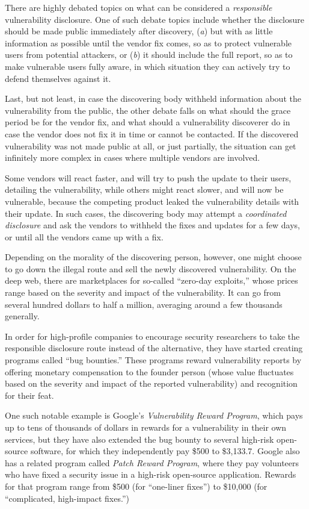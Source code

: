 \documentclass[a4paper,12pt]{article}
\begin{document}
	There are highly debated topics on what can be considered a \textit{responsible} vulnerability disclosure. One of such debate topics include whether the disclosure should be made public immediately after discovery, (\textit{a}) but with as little information as possible until the vendor fix comes, so as to protect vulnerable users from potential attackers, or (\textit{b}) it should include the full report, so as to make vulnerable users fully aware, in which situation they can actively try to defend themselves against it. 
	
	Last, but not least, in case the discovering body withheld information about the vulnerability from the public, the other debate falls on what should the grace period be for the vendor fix, and what should a vulnerability discoverer do in case the vendor does not fix it in time or cannot be contacted. If the discovered vulnerability was not made public at all, or just partially, the situation can get infinitely more complex in cases where multiple vendors are involved.
	
	Some vendors will react faster, and will try to push the update to their users, detailing the vulnerability, while others might react slower, and will now be vulnerable, because the competing product leaked the vulnerability details with their update. In such cases, the discovering body may attempt a \textit{coordinated disclosure} and ask the vendors to withheld the fixes and updates for a few days, or until all the vendors came up with a fix.
	
	Depending on the morality of the discovering person, however, one might choose to go down the illegal route and sell the newly discovered vulnerability. On the deep web, there are marketplaces for so-called ``zero-day exploits,'' whose prices range based on the severity and impact of the vulnerability. It can go from several hundred dollars to half a million, averaging around a few thousands generally\cite{nperlroth13}.
	
	In order for high-profile companies to encourage security researchers to take the responsible disclosure route instead of the alternative, they have started creating programs called ``bug bounties.'' These programs reward vulnerability reports by offering monetary compensation to the founder person (whose value fluctuates based on the severity and impact of the reported vulnerability) and recognition for their feat.
	
	One such notable example is Google's \textit{Vulnerability Reward Program}\cite{googlevrp15}, which pays up to tens of thousands of dollars in rewards for a vulnerability in their own services, but they have also extended the bug bounty to several high-risk open-source software, for which they independently pay \$500 to \$3,133.7. Google also has a related program called \textit{Patch Reward Program}, where they pay volunteers who have fixed a security issue in a high-risk open-source application. Rewards for that program range from \$500 (for ``one-liner fixes'') to \$10,000 (for ``complicated, high-impact fixes.'')
	
\end{document}
